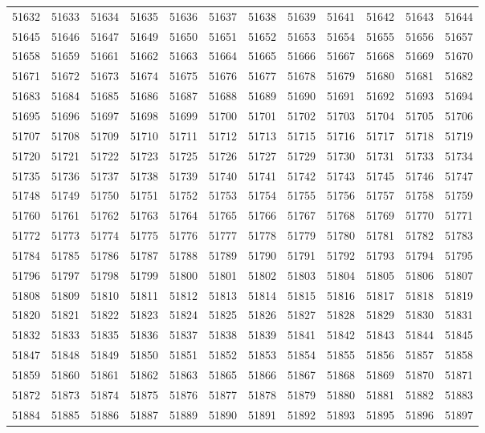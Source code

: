 \begin{center}
\begin{longtable}{llllllllllll}
51632 &51633 &51634 &51635 &51636 &51637 &51638 &51639 &51641 &51642 &51643 &51644 \\
51645 &51646 &51647 &51649 &51650 &51651 &51652 &51653 &51654 &51655 &51656 &51657 \\
51658 &51659 &51661 &51662 &51663 &51664 &51665 &51666 &51667 &51668 &51669 &51670 \\
51671 &51672 &51673 &51674 &51675 &51676 &51677 &51678 &51679 &51680 &51681 &51682 \\
51683 &51684 &51685 &51686 &51687 &51688 &51689 &51690 &51691 &51692 &51693 &51694 \\
51695 &51696 &51697 &51698 &51699 &51700 &51701 &51702 &51703 &51704 &51705 &51706 \\
51707 &51708 &51709 &51710 &51711 &51712 &51713 &51715 &51716 &51717 &51718 &51719 \\
51720 &51721 &51722 &51723 &51725 &51726 &51727 &51729 &51730 &51731 &51733 &51734 \\
51735 &51736 &51737 &51738 &51739 &51740 &51741 &51742 &51743 &51745 &51746 &51747 \\
51748 &51749 &51750 &51751 &51752 &51753 &51754 &51755 &51756 &51757 &51758 &51759 \\
51760 &51761 &51762 &51763 &51764 &51765 &51766 &51767 &51768 &51769 &51770 &51771 \\
51772 &51773 &51774 &51775 &51776 &51777 &51778 &51779 &51780 &51781 &51782 &51783 \\
51784 &51785 &51786 &51787 &51788 &51789 &51790 &51791 &51792 &51793 &51794 &51795 \\
51796 &51797 &51798 &51799 &51800 &51801 &51802 &51803 &51804 &51805 &51806 &51807 \\
51808 &51809 &51810 &51811 &51812 &51813 &51814 &51815 &51816 &51817 &51818 &51819 \\
51820 &51821 &51822 &51823 &51824 &51825 &51826 &51827 &51828 &51829 &51830 &51831 \\
51832 &51833 &51835 &51836 &51837 &51838 &51839 &51841 &51842 &51843 &51844 &51845 \\
51847 &51848 &51849 &51850 &51851 &51852 &51853 &51854 &51855 &51856 &51857 &51858 \\
51859 &51860 &51861 &51862 &51863 &51865 &51866 &51867 &51868 &51869 &51870 &51871 \\
51872 &51873 &51874 &51875 &51876 &51877 &51878 &51879 &51880 &51881 &51882 &51883 \\
51884 &51885 &51886 &51887 &51889 &51890 &51891 &51892 &51893 &51895 &51896 &51897 \\

\end{longtable}
\end{center}
